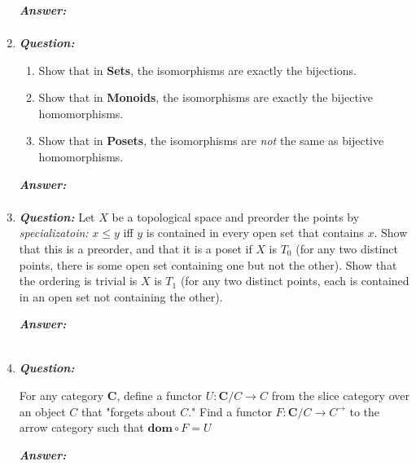 \documentclass{article}
\begin{document}
\begin{enumerate}
	      \textbf{\textit{Answer:}}
	      \begin{align*}
	      \end{align*}


	\item
	      \textbf{\textit{Question:}}
	      \begin{enumerate}
		      \item  Show that in \textbf{Sets}, the isomorphisms are exactly the bijections.
		      \item  Show that in \textbf{Monoids}, the isomorphisms are exactly the bijective homomorphisms.
		      \item  Show that in \textbf{Posets}, the isomorphisms are \textit{not} the same as bijective homomorphisms.

	      \end{enumerate}
	      \textbf{\textit{Answer:}}
	      \begin{align*}
	      \end{align*}

	\item
	      \textbf{\textit{Question:}}
	      Let $X$ be a topological space and preorder the points by \textit{specializatoin:} $x \leq y$ iff $y$ is contained in every open set that contains $x$. Show that this is a preorder, and that it is a poset if $X$ is $T_0$ (for any two distinct points, there is some open set containing one but not the other). Show that the ordering is trivial is $X$ is $T_1$ (for any two distinct points, each is contained in an open set not containing the other).

	      \textbf{\textit{Answer:}}

	      \begin{align*}
	      \end{align*}



	\item
	      \textbf{\textit{Question:}}

	      For any category \textbf{C}, define a functor $ U : \textbf{C} / C \to C $ from the slice category over an object $ C $ that "forgets about $ C $."  Find a functor $ F : \textbf{C} / C \to C^{\to}$  to the arrow category such that $ \textbf{dom} \circ F = U $

	      \textbf{\textit{Answer:}}

	      \begin{align*}
	      \end{align*}




\end{enumerate}
\end{document}

